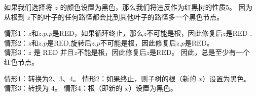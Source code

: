 \documentclass[a4paper, justified]{tufte-handout}
\begin{document}
\begin{problem}[TC 13.3-1]
\end{problem}

\begin{solution}
  如果我们选择将 $z$ 的颜色设置为黑色，那么我们将违反作为红黑树的性质5。 因为从根到 $z$下的叶子的任何路径都会比到其他叶子的路径多一个黑色节点。
\end{solution}

\begin{problem}[TC 13.3-5]
\end{problem}

\begin{solution}
  情形1：$z$和$z.p.p$是$\text{RED}$，如果循环终止，那么$z$不可能是根，因此修复后$z$是$\text{RED}$ .\\
  情形2：$z$和$z.p$是$\text{RED}$,旋转后$z.p$不可能是根，因此修复后$z.p$是$\text{RED}$。\\
  情形3：$z$ 是 $\text{RED}$ 并且$z$不能是根，因此修复后$z$是$\text{RED}$。
  因此，总是至少有一个红色节点。
\end{solution}

\begin{problem}[TC 13.4-1]
\end{problem}

\begin{solution}
  情形1：转换为2、3、4。
  情形2：如果终止，则子树的根（新的 $x$）设置为黑色。
  情形3：转换为 4。
  情形4：根（即新的 $x$）设置为黑色。
\end{solution}

\begin{problem}[TC 13.4-7]
\end{problem}
\end{document}
